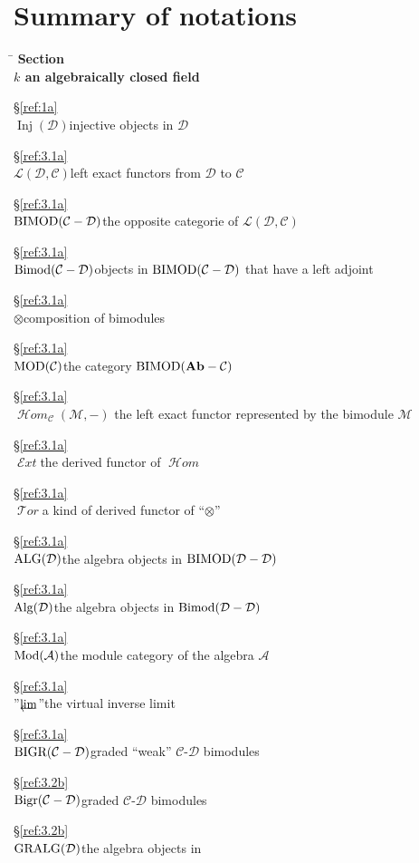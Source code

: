 \documentclass{amsproc}
\def\Ascr{{\mathcal A}}
\def\Cscr{{\mathcal C}}
\def\Dscr{{\mathcal D}}
\def\Escr{{\mathcal E}}
\def\Hscr{{\mathcal H}}
\def\Lscr{{\mathcal L}}
\def\Mscr{{\mathcal M}}
\def\Tscr{{\mathcal T}}
\def\HHom{\operatorname {\Hscr \mathit{om}}}
\def\HExt{\operatorname {\Escr \mathit{xt}}}
\def\HTor{\operatorname {\Tscr \mathit{or}}}
\def\Ab{\mathbf{Ab}}
\def\Mod{\mathop{\text{Mod}}}
\def\MOD{\mathop{\text{MOD}}}
\def\Bimod{\mathop{\text{Bimod}}}
\def\BIMOD{\mathop{\text{BIMOD}}}
\def\cohBIMOD{\mathop{\text{cohBIMOD}}}
\def\Bigr{\mathop{\text{Bigr}}}
\def\BIGR{\mathop{\text{BIGR}}}
\def\Alg{\mathop{\text{Alg}}}
\def\ALG{\mathop{\text{ALG}}}
\def\GRALG{\mathop{\text{GRALG}}}
\def\Inj{\operatorname {Inj}}
\def\HHom{\operatorname {\Hscr \mathit{om}}}
\def\HExt{\operatorname {\Escr \mathit{xt}}}
\def\HTor{\operatorname {\Tscr \mathit{or}}}
\let\oldtext\text
\def\text#1{\oldtext{\upshape #1}}
\let\invlim\projlim
\theoremstyle{definition}
\theoremstyle{remark}
\def\invlim{\mathop{\vtop{\baselineskip -100pt\lineskip -1pt\lineskiplimit 0pt
\setbox0\hbox{\upshape lim}\copy0\hbox to \wd0{\leftarrowfill}}}\limits}
\numberwithin{equation}{section}
\numberwithin{table}{section}
\numberwithin{figure}{section}
\begin{document}
\section{Summary of notations}
\begin{tabbing}
\haswidth{$\cohBIMOD(o_X-o_X)$\hskip
0.2cm}\=\=\bf
Section\=\\[\smallskipamount] $k$\> an algebraically closed
field\>\strut\hfill\S\ref{ref:1a}\>\\
$\Inj(\Dscr)$\>injective objects in $\Dscr$\>\strut\hfill\S\ref{ref:3.1a}\>\\
$\Lscr(\Dscr,\Cscr)$\>left exact functors from $\Dscr$ to
$\Cscr$\>\strut\hfill\S\ref{ref:3.1a}\>\\ $\BIMOD(\Cscr-\Dscr)$\>the
opposite categorie of
$\Lscr(\Dscr,\Cscr)$\>\strut\hfill\S\ref{ref:3.1a}\>\\
$\Bimod(\Cscr-\Dscr)$\>objects in $\BIMOD(\Cscr-\Dscr)$ that have a
left adjoint\>\strut\hfill\S\ref{ref:3.1a}\>\\ $\otimes$\>composition of
bimodules\>\strut\hfill\S\ref{ref:3.1a}\>\\ $\MOD(\Cscr)$\>the category
$\BIMOD(\Ab-\Cscr)$\>\strut\hfill\S\ref{ref:3.1a}\>\\
$\HHom_\Cscr(\Mscr,-)$\> the left exact functor represented by the
bimodule $\Mscr$\>\strut\hfill\S\ref{ref:3.1a}\>\\ $\HExt$\>the derived functor
of $\HHom$\>\strut\hfill\S\ref{ref:3.1a}\>\\ $\HTor$\>a kind of derived
functor of ``$\otimes$'' \>\strut\hfill\S\ref{ref:3.1a}\>\\
$\ALG(\Dscr)$\>the algebra objects in
$\BIMOD(\Dscr-\Dscr)$\>\strut\hfill\S\ref{ref:3.1a}\>\\
$\Alg(\Dscr)$\>the algebra objects in
$\Bimod(\Dscr-\Dscr)$\>\strut\hfill\S\ref{ref:3.1a}\>\\
$\Mod(\Ascr)$\>the module category of the algebra
$\Ascr$\>\strut\hfill\S\ref{ref:3.1a}\>\\ ''$\invlim$''\>the virtual
inverse limit\>\strut\hfill\S\ref{ref:3.1a}\>\\
$\BIGR(\Cscr-\Dscr)$\>graded ``weak'' $\Cscr$-$\Dscr$ bimodules
\>\strut\hfill\S\ref{ref:3.2b}\>\\ $\Bigr(\Cscr-\Dscr)$\>graded
$\Cscr$-$\Dscr$ bimodules\>\strut\hfill\S\ref{ref:3.2b}\>\\
$\GRALG(\Dscr)$\>the algebra objects in

\end{tabbing}
\end{document}
